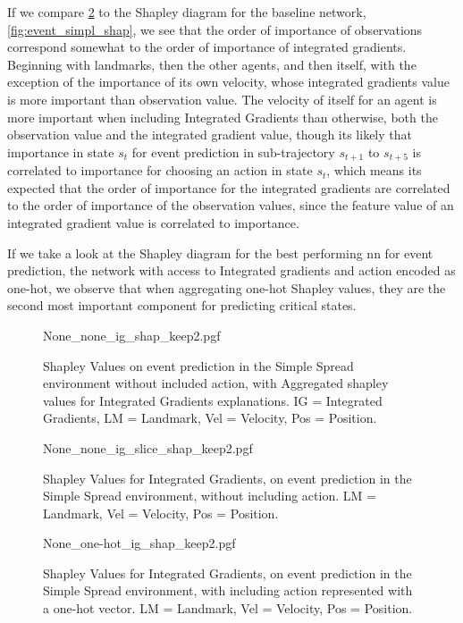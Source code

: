 \documentclass[UKenglish]{uiomasterthesis}
\begin{document}
If we compare \cref{fig:event_simpl_ig_slice} to the Shapley diagram for the baseline network, \cref{fig:event_simpl_shap}, we see that the order of importance of observations correspond somewhat to the order of importance of integrated gradients. Beginning with landmarks, then the other agents, and then itself, with the exception of the importance of its own velocity, whose integrated gradients value is more important than observation value.
The velocity of itself for an agent is more important when including Integrated Gradients than otherwise, both the observation value and the integrated gradient value, though its likely that importance in state $s_t$ for event prediction in sub-trajectory $s_{t+1}$ to $s_{t+5}$ is correlated to importance for choosing an action in state $s_t$, which means its expected that the order of importance for the integrated gradients are correlated to the order of importance of the observation values, since the feature value of an integrated gradient value is correlated to importance.

If we take a look at the Shapley diagram for the best performing \ac{nn} for event prediction, the network with access to Integrated gradients and action encoded as one-hot, we observe that when aggregating one-hot Shapley values, they are the second most important component for predicting critical states. 

\begin{figure}[H]
    \centering
{None_none_ig_shap_keep2.pgf}
\caption{Shapley Values on event prediction in the Simple Spread environment without included action, with Aggregated shapley values for Integrated Gradients explanations. IG = Integrated Gradients, LM = Landmark, Vel = Velocity, Pos = Position.}
\label{fig:event_simpl_ig_shap}
\end{figure}

\begin{figure}[H]
\centering
{None_none_ig_slice_shap_keep2.pgf}
\caption{Shapley Values for Integrated Gradients, on event prediction in the Simple Spread environment, without including action. LM = Landmark, Vel = Velocity, Pos = Position.}
\label{fig:event_simpl_ig_slice}
\end{figure}

\begin{figure}[H]
    \centering
{None_one-hot_ig_shap_keep2.pgf}
\caption{Shapley Values for Integrated Gradients, on event prediction in the Simple Spread environment, with including action represented with a one-hot vector. LM = Landmark, Vel = Velocity, Pos = Position.}
\label{fig:event_simpl_one-hot_ig_shap}
\end{figure}
\end{document}
